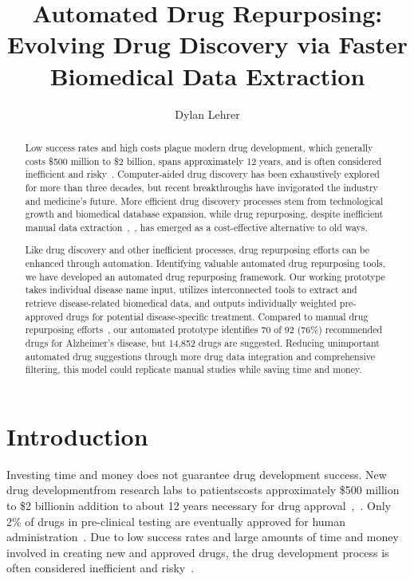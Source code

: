 \documentclass{IEEEtran}
\title{Automated Drug Repurposing: Evolving Drug Discovery via Faster Biomedical Data Extraction}
\author{Dylan Lehrer}
\date{}
\begin{document}
	
	\maketitle
	\pagestyle{plain}
	
	\begin{abstract}
	Low success rates and high costs plague modern drug development, which generally costs \$500 million to \$2 billion, spans approximately 12 years, and is often considered inefficient and risky~\cite{kaitin}.  Computer-aided drug discovery has been exhaustively explored for more than three decades, but recent breakthroughs have invigorated the industry and medicine's future.  More efficient drug discovery processes stem from technological growth and biomedical database expansion, while drug repurposing, despite inefficient manual data extraction~\cite{zhang15},~\cite{zhang16}, has emerged as a cost-effective alternative to old ways.  
	
	Like drug discovery and other inefficient processes, drug repurposing efforts can be enhanced through automation. Identifying valuable automated drug repurposing tools, we have developed an automated drug repurposing framework.  Our working prototype takes individual disease name input, utilizes interconnected tools to extract and retrieve disease-related biomedical data, and outputs individually weighted pre-approved drugs for potential disease-specific treatment.  Compared to manual drug repurposing efforts~\cite{zhang16}, our automated prototype identifies 70 of 92 (76\%) recommended drugs for Alzheimer's disease, but 14,852 drugs are suggested.  Reducing unimportant automated drug suggestions through more drug data integration and comprehensive filtering, this model could replicate manual studies while saving time and money.
	\end{abstract}
	
	\tableofcontents
	\listoffigures
	\listoftables
	
	\section{Introduction}
		Investing time and money does not guarantee drug development success.  New drug development\textemdash from research labs to patients\textemdash costs approximately \$500 million to \$2 billion\textemdash in addition to about 12 years necessary for drug approval~\cite{cbra},~\cite{boguski}.  Only 2\% of drugs in pre-clinical testing are eventually approved for human administration~\cite{cbra}.  Due to low success rates and large amounts of time and money involved in creating new and approved drugs, the drug development process is often considered inefficient and risky~\cite{kaitin}.  
		
\end{document}
